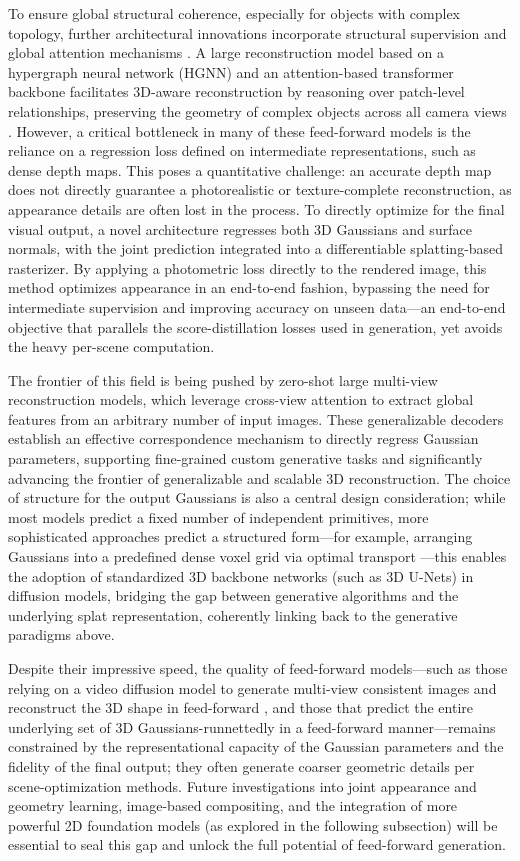 \documentclass[11pt,a4paper]{article}
\begin{document}
To ensure global structural coherence, especially for objects with complex topology, further architectural innovations incorporate structural supervision and global attention mechanisms \cite{arxiv:2403.19655v2}. A large reconstruction model based on a hypergraph neural network (HGNN) and an attention-based transformer backbone facilitates 3D-aware reconstruction by reasoning over patch-level relationships, preserving the geometry of complex objects across all camera views \cite{arxiv:2403.19655v2}. However, a critical bottleneck in many of these feed-forward models is the reliance on a regression loss defined on intermediate representations, such as dense depth maps. This poses a quantitative challenge: an accurate depth map does not directly guarantee a photorealistic or texture-complete reconstruction, as appearance details are often lost in the process. To directly optimize for the final visual output, a novel architecture regresses both 3D Gaussians and surface normals, with the joint prediction integrated into a differentiable splatting-based rasterizer. By applying a photometric loss directly to the rendered image, this method optimizes appearance in an end-to-end fashion, bypassing the need for intermediate supervision and improving accuracy on unseen data---an end-to-end objective that parallels the score-distillation losses used in generation, yet avoids the heavy per-scene computation.

The frontier of this field is being pushed by zero-shot large multi-view reconstruction models, which leverage cross-view attention to extract global features from an arbitrary number of input images. These generalizable decoders establish an effective correspondence mechanism to directly regress Gaussian parameters, supporting fine-grained custom generative tasks and significantly advancing the frontier of generalizable and scalable 3D reconstruction. The choice of structure for the output Gaussians is also a central design consideration; while most models predict a fixed number of independent primitives, more sophisticated approaches predict a structured form---for example, arranging Gaussians into a predefined dense voxel grid via optimal transport \cite{arxiv:2403.19655v2}---this enables the adoption of standardized 3D backbone networks (such as 3D U-Nets) in diffusion models, bridging the gap between generative algorithms and the underlying splat representation, coherently linking back to the generative paradigms above.

Despite their impressive speed, the quality of feed-forward models---such as those relying on a video diffusion model to generate multi-view consistent images and reconstruct the 3D shape in feed-forward \cite{arxiv:2403.19655v2}, and those that predict the entire underlying set of 3D Gaussians-runnettedly in a feed-forward manner---remains constrained by the representational capacity of the Gaussian parameters and the fidelity of the final output; they often generate coarser geometric details per scene-optimization methods. Future investigations into joint appearance and geometry learning, image-based compositing, and the integration of more powerful 2D foundation models (as explored in the following subsection) will be essential to seal this gap and unlock the full potential of feed-forward generation.
\end{document}

